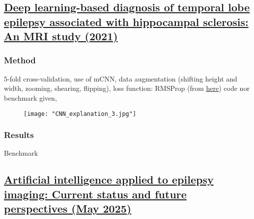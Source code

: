 \subsection{\href{https://www.sciencedirect.com/science/article/pii/S0920121121002709\#sec0010}{Deep learning-based diagnosis of temporal lobe epilepsy associated with hippocampal sclerosis: An MRI study (2021)}}

\subsubsection{Method}

5-fold cross-validation, 
use of mCNN, 
data augmentation (shifting height and width, zooming, shearing, flipping),
loss function: RMSProp (from \href{https://www.sciencedirect.com/science/article/pii/S0920121121002709\#bib21}{here})
code nor benchmark given,

\begin{figure}[htbp]
	\centering
	\texttt{[image: "CNN\_explanation\_3.jpg"]}
\end{figure}

\subsubsection{Results}

\begin{table}[htbp]
	\centering
	\caption{Benchmark}

	\caption{Results}
\end{table}

\subsection{\href{https://academic.oup.com/brain/advance-article/doi/10.1093/brain/awaf020/7972755\#510821169}{Artificial intelligence applied to epilepsy imaging: Current status and future perspectives (May 2025)}}
\label{sub:sec:3dcnn_article}

